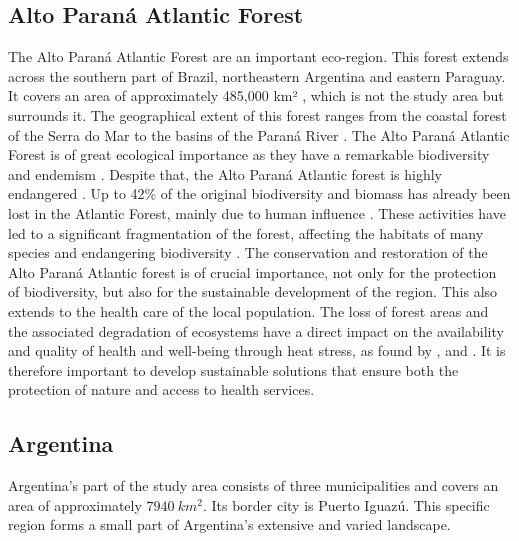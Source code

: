 \documentclass[11pt, a4paper]{report}
\begin{document}
\subsection{Alto Paraná Atlantic Forest}
The Alto Paraná Atlantic Forest are an important eco-region. This forest extends across the southern part of Brazil, northeastern Argentina and eastern Paraguay. It covers an area of approximately 485,000 km² \citet{schipper_alto_2018}, which is not the study area but surrounds it. The geographical extent of this forest ranges from the coastal forest of the Serra do Mar to the basins of the Paraná River \citet{schipper_alto_2018}. The Alto Paraná Atlantic Forest is of great ecological importance as they have a remarkable biodiversity and endemism \citet{de_lima_erosion_2020}. Despite that, the Alto Paraná Atlantic forest is highly endangered \citet{de_lima_erosion_2020}. Up to 42\% of the original biodiversity and biomass has already been lost in the Atlantic Forest, mainly due to human influence \citet{de_lima_erosion_2020}. These activities have led to a significant fragmentation  of the forest, affecting the habitats of many species and endangering biodiversity \citet{gennerich_land-use_2024}.
The conservation and restoration of the Alto Paraná Atlantic forest is of crucial importance, not only for the protection of biodiversity, but also for the sustainable development of the region. This also extends to the health care of the local population. The loss of forest areas and the associated degradation of ecosystems have a direct impact on the availability and quality of health and well-being through heat stress, as found by \citet{palmer_no_2022}, \citet{hedin_connecting_2022} and \cite{deivanayagam_breaking_2023}. It is therefore important to develop sustainable solutions that ensure both the protection of nature and access to health services. 

\subsection{Argentina}
Argentina's part of the study area consists of three municipalities and covers an area of approximately $7940 \ km^2$. Its border city is Puerto Iguazú. This specific region forms a small part of Argentina's extensive and varied landscape.
\end{document}
